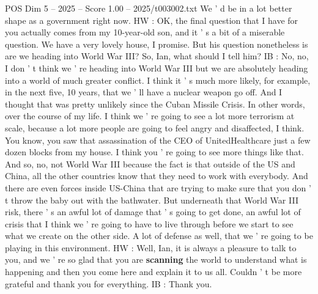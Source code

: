 \begin{textsample}{POS Dim 5 – 2025 – Score 1.00 – 2025/t003002.txt}
We ' d be in a lot better shape as a government right now.
HW : OK, the final question that I have for you actually comes from my 10-year-old son, and it ' s a bit of a miserable question.
We have a very lovely house, I promise.
But his question nonetheless is are we heading into World War III?
So, Ian, what should I tell him?
IB : No, no, I don ' t think we ' re heading into World War III but we are absolutely heading into a world of much greater conflict.
I think it ' s much more likely, for example, in the next five, 10 years, that we ' ll have a nuclear weapon go off.
And I thought that was pretty unlikely since the Cuban Missile Crisis.
In other words, over the course of my life.
I think we ' re going to see a lot more terrorism at scale, because a lot more people are going to feel angry and disaffected, I think.
You know, you saw that assassination of the CEO of UnitedHealthcare just a few dozen blocks from my house.
I think you ' re going to see more things like that.
And so, no, not World War III because the fact is that outside of the US and China, all the other countries know that they need to work with everybody.
And there are even forces inside US-China that are trying to make sure that you don ' t throw the baby out with the bathwater.
But underneath that World War III risk, there ' s an awful lot of damage that ' s going to get done, an awful lot of crisis that I think we ' re going to have to live through before we start to see what we create on the other side.
A lot of defense as well, that we ' re going to be playing in this environment.
HW : Well, Ian, it is always a pleasure to talk to you, and we ' re so glad that you are \textbf{scanning} the world to understand what is happening and then you come here and explain it to us all.
Couldn ' t be more grateful and thank you for everything.
IB : Thank you.

\end{textsample}
